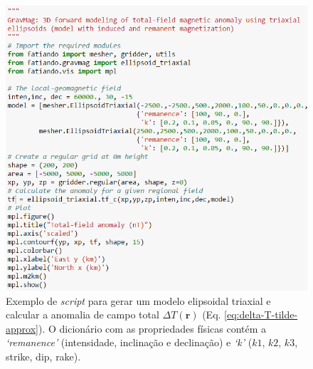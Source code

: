\begin{figure}[hbt!]
	\centering \includegraphics[width=16 cm,height=17 cm]{figures/Cookbook_Triaxial}
	\caption[Exemplo de \textit{script} para gerar um modelo elipsoidal triaxial e calcular a anomalia de campo total $\Delta T (\mathbf{r})$ (Eq. \ref{eq:delta-T-tilde-approx}). O dicionário com as propriedades físicas contém a \textit{`remanence'} (intensidade, inclinação e declinação) e \textit{`k'} ($k1$, $k2$, $k3$, strike, dip, rake).]{Exemplo de \textit{script} para gerar um modelo elipsoidal triaxial e calcular a anomalia de campo total $\Delta T (\mathbf{r})$ (Eq. \ref{eq:delta-T-tilde-approx}). O dicionário com as propriedades físicas contém a \textit{`remanence'} (intensidade, inclinação e declinação) e \textit{`k'} ($k1$, $k2$, $k3$, strike, dip, rake).}
	\label{fig:Cookbook_Triaxial}
\end{figure}

